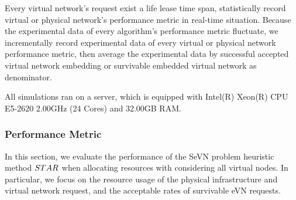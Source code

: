 Every virtual network's request exist a life lease time span, statistically record virtual or physical network's performance metric in real-time situation. Because the experimental data of every algorithm's performance metric fluctuate, we incrementally record experimental data of every virtual or physical network performance metric, then average the experimental data by successful accepted virtual network embedding or survivable embedded virtual network  as denominator.


All simulations ran on a server, which is equipped with Intel(R) Xeon(R) CPU E5-2620 2.00GHz (24 Cores) and 32.00GB RAM.


\subsubsection{Performance Metric}
In this section, we evaluate the performance of the SeVN problem heuristic method $STAR$ when allocating resources with considering all virtual nodes. In particular, we focus on the resource usage of the physical infrastructure and virtual network request, and the acceptable rates of survivable eVN  requests.




